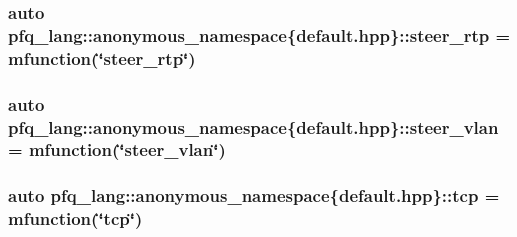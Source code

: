 \hypertarget{namespacepfq__lang_1_1anonymous__namespace_02default_8hpp_03_a16b18fdc10f8dd8c0974d9f0d6c13af9}{
\subsubsection[{steer\+\_\+rtp}]{\setlength{\rightskip}{0pt plus 5cm}auto pfq\+\_\+lang\+::anonymous\+\_\+namespace\{default.\+hpp\}\+::steer\+\_\+rtp = {\bf mfunction}(\char`\"{}steer\+\_\+rtp\char`\"{})}}\label{namespacepfq__lang_1_1anonymous__namespace_02default_8hpp_03_a16b18fdc10f8dd8c0974d9f0d6c13af9}
\hypertarget{namespacepfq__lang_1_1anonymous__namespace_02default_8hpp_03_ad32804252244d5b572b9f5fe0cdda675}{
\subsubsection[{steer\+\_\+vlan}]{\setlength{\rightskip}{0pt plus 5cm}auto pfq\+\_\+lang\+::anonymous\+\_\+namespace\{default.\+hpp\}\+::steer\+\_\+vlan = {\bf mfunction}(\char`\"{}steer\+\_\+vlan\char`\"{})}}\label{namespacepfq__lang_1_1anonymous__namespace_02default_8hpp_03_ad32804252244d5b572b9f5fe0cdda675}
\hypertarget{namespacepfq__lang_1_1anonymous__namespace_02default_8hpp_03_a4046140746c0012b4d1ea8d3ef53f084}{
\subsubsection[{tcp}]{\setlength{\rightskip}{0pt plus 5cm}auto pfq\+\_\+lang\+::anonymous\+\_\+namespace\{default.\+hpp\}\+::tcp = {\bf mfunction}(\char`\"{}tcp\char`\"{})}}\label{namespacepfq__lang_1_1anonymous__namespace_02default_8hpp_03_a4046140746c0012b4d1ea8d3ef53f084}
